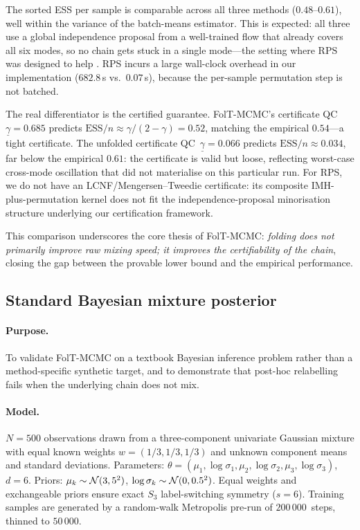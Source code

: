 The sorted ESS per sample is comparable across all three methods
($0.48$--$0.61$), well within the variance of the batch-means
estimator.  This is expected: all three use a global independence
proposal from a well-trained flow that already covers all six
modes, so no chain gets stuck in a single mode---the setting where
RPS was designed to help \citep{FruhwirthSchnatter2001}.
RPS incurs a large wall-clock overhead in our implementation
($682.8$\,s vs.\ $0.07$\,s), because the per-sample permutation
step is not batched.

The real differentiator is the certified guarantee.
FolT-MCMC's certificate QC~$\underline{\gamma} = 0.685$ predicts
$\mathrm{ESS}/n \approx \gamma/(2-\gamma) = 0.52$, matching the
empirical $0.54$---a tight certificate.
The unfolded certificate QC~$\underline{\gamma} = 0.066$ predicts
$\mathrm{ESS}/n \approx 0.034$, far below the empirical $0.61$:
the certificate is valid but loose, reflecting worst-case
cross-mode oscillation that did not materialise on this particular
run.
For RPS, we do not have an LCNF/Mengersen--Tweedie certificate:
its composite IMH-plus-permutation kernel does not fit the
independence-proposal minorisation structure underlying our
certification framework.

This comparison underscores the core thesis of FolT-MCMC:
\emph{folding does not primarily improve raw mixing speed; it
improves the certifiability of the chain}, closing the gap between
the provable lower bound and the empirical performance.


\subsection{Standard Bayesian mixture posterior}
\label{sec:exp_bayesian_mixture}

\paragraph{Purpose.}
To validate FolT-MCMC on a textbook Bayesian inference problem
rather than a method-specific synthetic target, and to demonstrate
that post-hoc relabelling fails when the underlying chain does not
mix.

\paragraph{Model.}
$N = 500$ observations drawn from a three-component univariate
Gaussian mixture with equal known weights
$w = (1/3, 1/3, 1/3)$ and unknown component means and
standard deviations.
Parameters: $\theta = (\mu_1, \log\sigma_1, \mu_2, \log\sigma_2,
\mu_3, \log\sigma_3)$, $d = 6$.
Priors: $\mu_k \sim \mathcal{N}(3, 5^2)$,
$\log\sigma_k \sim \mathcal{N}(0, 0.5^2)$.
Equal weights and exchangeable priors ensure exact $S_3$
label-switching symmetry ($s = 6$).
Training samples are generated by a random-walk Metropolis
pre-run of $200\,000$~steps, thinned to $50\,000$.

